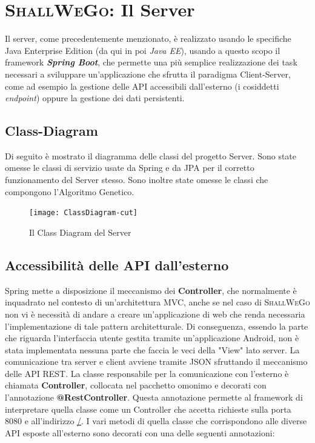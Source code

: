 \section{\textsc{ShallWeGo}: Il Server}
    Il server, come precedentemente menzionato, è realizzato usando le specifiche Java Enterprise Edition (da qui in poi \textit{Java EE}), usando a questo scopo il framework \textbf{\textit{Spring Boot}}, che permette una più semplice realizzazione dei task necessari a sviluppare un'applicazione che sfrutta il paradigma Client-Server, come ad esempio la gestione delle API accessibili dall'esterno (i cosiddetti \textit{endpoint}) oppure la gestione dei dati persistenti.

    \subsection{Class-Diagram}
        Di seguito è mostrato il diagramma delle classi del progetto Server. Sono state omesse le classi di servizio usate da Spring e da JPA per il corretto funzionamento del Server stesso. Sono inoltre state omesse le classi che compongono l'Algoritmo Genetico.

        \begin{figure}[H]
            \texttt{[image: ClassDiagram-cut]}
            \caption{Il Class Diagram del Server}
            \label{fig: Il Class Diagram del Server}
        \end{figure}

    \subsection{Accessibilità delle API dall'esterno}
        Spring mette a disposizione il meccanismo dei \textbf{Controller}, che normalmente è inquadrato nel contesto di un'architettura MVC, anche se nel caso di \textsc{ShallWeGo} non vi è necessità di andare a creare un'applicazione di web che renda necessaria l'implementazione di tale pattern architetturale. Di conseguenza, essendo la parte che riguarda l'interfaccia utente gestita tramite un'applicazione Android, non è stata implementata nessuna parte che faccia le veci della "View" lato server. La comunicazione tra server e client avviene tramite JSON sfruttando il meccanismo delle API REST. La classe responsabile per la comunicazione con l'esterno è chiamata \textbf{Controller}, collocata nel pacchetto omonimo e decorati con l'annotazione \textbf{@RestController}. Questa annotazione permette al framework di interpretare quella classe come un Controller che accetta richieste sulla porta 8080 e all'indirizzo \url{/}. I vari metodi di quella classe che corrispondono alle diverse API esposte all'esterno sono decorati con una delle seguenti annotazioni:

